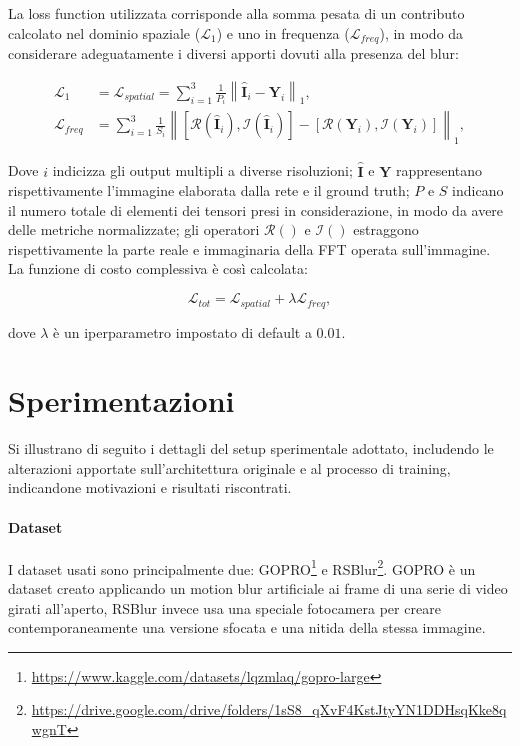 \documentclass[a4paper,10pt,twocolumn]{article}
\begin{document}
La loss function utilizzata corrisponde alla somma pesata di un contributo calcolato nel dominio spaziale (\(\mathcal{L}_1\)) e uno in frequenza (\(\mathcal{L}_{freq}\)), in modo da considerare adeguatamente i diversi apporti dovuti alla presenza del blur:

\begin{align}
  \mathcal{L}_1 &= \mathcal{L}_{spatial} = \sum_{i=1}^{3}\frac{1}{P_i} \left\lVert \hat{\mathbf{I}}_i - \mathbf{Y}_i \right\rVert _1, \\
  \mathcal{L}_{freq} &= \sum_{i=1}^{3}\frac{1}{S_i} \left\lVert [\mathcal{R}(\hat{\mathbf{I}}_i), \mathcal{I}(\hat{\mathbf{I}}_i)] - [\mathcal{R}(\mathbf{Y}_i), \mathcal{I}(\mathbf{Y}_i)] \right\rVert _1,
\end{align}

Dove \(i\) indicizza gli output multipli a diverse risoluzioni; \(\hat{\mathbf{I}}\) e \(\mathbf{Y}\) rappresentano rispettivamente l'immagine elaborata dalla rete e il ground truth;
\(P\) e \(S\) indicano il numero totale di elementi dei tensori presi in considerazione, in modo da avere delle metriche normalizzate;
gli operatori \(\mathcal{R}()\) e \(\mathcal{I}()\) estraggono rispettivamente la parte reale e immaginaria della FFT operata sull'immagine.\\
La funzione di costo complessiva è così calcolata:

\begin{equation}
  \mathcal{L}_{tot} = \mathcal{L}_{spatial} + \lambda\mathcal{L}_{freq},
  \label{eq:total_loss_function}
\end{equation}

dove \(\lambda\) è un iperparametro impostato di default a \(0.01\).

\section{Sperimentazioni}

Si illustrano di seguito i dettagli del setup sperimentale adottato, includendo le alterazioni apportate sull'architettura originale e al processo di training, indicandone motivazioni e risultati riscontrati.

\paragraph{Dataset}
I dataset usati sono principalmente due: GOPRO\footnote{\url{https://www.kaggle.com/datasets/lqzmlaq/gopro-large}} e RSBlur\footnote{\url{https://drive.google.com/drive/folders/1sS8_qXvF4KstJtyYN1DDHsqKke8qwgnT}}.
GOPRO è un dataset creato applicando un motion blur artificiale ai frame di una serie di video girati all'aperto, RSBlur invece usa una speciale fotocamera per creare contemporaneamente
una versione sfocata e una nitida della stessa immagine.
\end{document}

